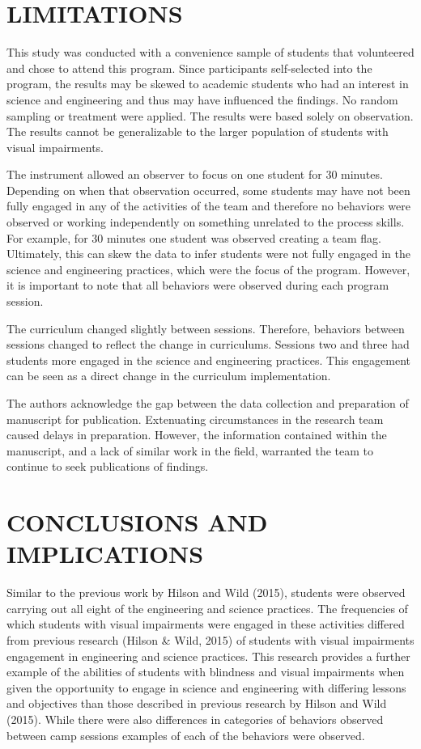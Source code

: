 \documentclass[11.5pt]{sig-alternate} %
\begin{document}
\begin{large}
\section*{LIMITATIONS}

This study was conducted with a convenience sample of students that volunteered and chose to attend this program. Since participants self-selected into the program, the results may be skewed to academic students who had an interest in science and engineering and thus may have influenced the findings. No random sampling or treatment were applied. The results were based solely on observation. The results cannot be generalizable to the larger population of students with visual impairments.  

The instrument allowed an observer to focus on one student for 30 minutes. Depending on when that observation occurred, some students may have not been fully engaged in any of the activities of the team and therefore no behaviors were observed or working independently on something unrelated to the process skills. For example, for 30 minutes one student was observed creating a team flag.  Ultimately, this can skew the data to infer students were not fully engaged in the science and engineering practices, which were the focus of the program. However, it is important to note that all behaviors were observed during each program session.

The curriculum changed slightly between sessions. Therefore, behaviors between sessions changed to reflect the change in curriculums. Sessions two and three had students more engaged in the science and engineering practices. This engagement can be seen as a direct change in the curriculum implementation.  

The authors acknowledge the gap between the data collection and preparation of manuscript for publication. Extenuating circumstances in the research team caused delays in preparation. However, the information contained within the manuscript, and a lack of similar work in the field, warranted the team to continue to seek publications of findings.  

\section*{CONCLUSIONS AND IMPLICATIONS}

Similar to the previous work by Hilson and Wild (2015), students were observed carrying out all eight of the engineering and science practices. The frequencies of which students with visual impairments were engaged in these activities differed from previous research (Hilson \& Wild, 2015) of students with visual impairments engagement in engineering and science practices. This research provides a further example of the abilities of students with blindness and visual impairments when given the opportunity to engage in science and engineering with differing lessons and objectives than those described in previous research by Hilson and Wild (2015). While there were also differences in categories of behaviors observed between camp sessions examples of each of the behaviors were observed.  


\end{large}
\end{document}
